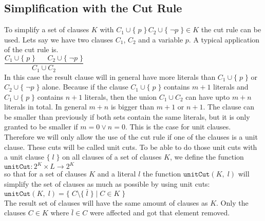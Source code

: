\subsection{Simplification with the Cut Rule}
\label{sub:sciDavisPutnamCutRule}
To simplify a set of clauses $K$ with $C_1 \cup \{\; p\; \}\, C_2 \cup \{\; \neg p\; \} \in K$ the cut rule can be used. Lets say we have two clauses $C_1$, $C_2$ and a variable $p$. A typical application of the cut rule is.
\\
\hspace*{1.3cm} $\dfrac{C_1 \cup \{\; p\; \} \;\;\;\;\;\; C_2 \cup \{\; \neg p\; \}}{C_1 \cup C_2}$
\\[0.2cm]
In this case the result clause will in general have more literals than $C_1 \cup \{\; p\; \}$ or $C_2 \cup \{\; \neg p\; \}$ alone. Because if the clause $C_1 \cup \{\; p\; \}$ contains $m + 1$ literals and $C_1 \cup \{\; p\; \}$ contains $n + 1$ literals, then the union $C_1 \cup C_2$ can have upto $m + n$ literals in total. In general $m + n$ is bigger than $m + 1$ or $n + 1$. The clause can be smaller than previously if both sets contain the same literals, but it is only granted to be smaller if $m = 0 \lor n = 0$. This is the case for unit clauses. Therefore we will only allow the use of the cut rule if one of the clauses is a unit clause. These cuts will be called unit cuts. To be able to do those unit cuts with a unit clause $\{\; l\; \}$ on all clauses of a set of clauses $K$, we define the function
\\
\hspace*{1.3cm} $\texttt{unitCut}: 2^{K} \times L \to 2^{K}$
\\[0.2cm]
so that for a set of clauses $K$ and a literal $l$ the function $\texttt{unitCut}(K,\; l)$ will simplify the set of clauses as much as possible by using unit cuts:
\\
\hspace*{1.3cm} $\texttt{unitCut}(K,\; l) = \{\; C \setminus \{\; \bar{l}\; \}\; |\; C \in K\; \}$
\\[0.2cm]
The result set of clauses will have the same amount of clauses as $K$. Only the clauses $C \in K$ where $\bar{l} \in C$ were affected and got that element removed. \cite{Stroetman2019}


